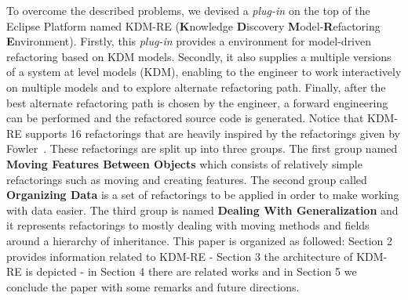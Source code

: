 To overcome the described problems, we devised a \textit{plug-in} on the top of the Eclipse Platform named KDM-RE (\textbf{K}nowledge \textbf{D}iscovery \textbf{M}odel-\textbf{R}efactoring \textbf{E}nvironment). Firstly, this \textit{plug-in} provides a environment for model-driven refactoring based on KDM models. Secondly, it also supplies a multiple versions of a system at level models (KDM), enabling to the engineer  to work interactively on multiple models and to explore alternate refactoring path. Finally, after the best alternate refactoring path is chosen by the engineer, a forward engineering can be performed and the refactored source code is generated. Notice that KDM-RE supports 16 refactorings that are heavily inspired by the refactorings given by Fowler~\cite{refactImpro}. These refactorings are split up into three groups. The first group named \textbf{Moving Features Between Objects} which consists of relatively simple refactorings such as moving and creating features. The second group called \textbf{Organizing Data} is a set of refactorings to be applied in order to make working with data easier. The third group is named \textbf{Dealing With Generalization} and it represents refactorings to mostly dealing with moving methods and fields around a hierarchy of inheritance. This paper is organized as followed: Section 2 provides information related to KDM-RE - Section 3 the architecture of KDM-RE is depicted - in Section 4 there are related works and in Section 5 we conclude the paper with some remarks and future directions.





